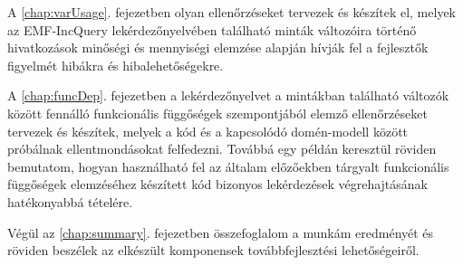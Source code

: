 A \ref{chap:varUsage}. fejezetben olyan ellenőrzéseket tervezek és készítek el, melyek az EMF-IncQuery lekérdezőnyelvében található minták változóira történő hivatkozások minőségi és mennyiségi elemzése alapján hívják fel a fejlesztők figyelmét hibákra és hibalehetőségekre.

A \ref{chap:funcDep}. fejezetben a lekérdezőnyelvet a mintákban található változók között fennálló funkcionális függőségek szempontjából elemző ellenőrzéseket tervezek és készítek, melyek a kód és a kapcsolódó domén-modell között próbálnak ellentmondásokat felfedezni.
Továbbá egy példán keresztül röviden bemutatom, hogyan használható fel az általam előzőekben tárgyalt funkcionális függőségek elemzéséhez készített kód bizonyos lekérdezések végrehajtásának hatékonyabbá tételére.

Végül az \ref{chap:summary}. fejezetben összefoglalom a munkám eredményét és röviden beszélek az elkészült komponensek továbbfejlesztési lehetőségeiről.
